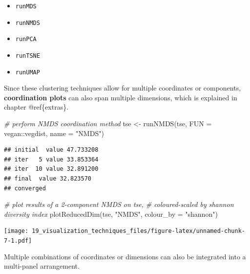 \documentclass[
]{book}
\newenvironment{Shaded}{\begin{snugshade}}{\end{snugshade}}
\newcommand{\AttributeTok}[1]{\textcolor[rgb]{0.77,0.63,0.00}{#1}}
\newcommand{\CommentTok}[1]{\textcolor[rgb]{0.56,0.35,0.01}{\textit{#1}}}
\newcommand{\FunctionTok}[1]{\textcolor[rgb]{0.00,0.00,0.00}{#1}}
\newcommand{\NormalTok}[1]{#1}
\newcommand{\OtherTok}[1]{\textcolor[rgb]{0.56,0.35,0.01}{#1}}
\newcommand{\SpecialCharTok}[1]{\textcolor[rgb]{0.00,0.00,0.00}{#1}}
\newcommand{\StringTok}[1]{\textcolor[rgb]{0.31,0.60,0.02}{#1}}
\providecommand{\tightlist}{%
  \setlength{\itemsep}{0pt}\setlength{\parskip}{0pt}}
\begin{document}
\begin{itemize}
\tightlist
\item
  \texttt{runMDS}
\item
  \texttt{runNMDS}
\item
  \texttt{runPCA}
\item
  \texttt{runTSNE}
\item
  \texttt{runUMAP}
\end{itemize}

Since these clustering techniques allow for multiple coordinates or components,
\textbf{coordination plots} can also span multiple dimensions, which is explained in chapter @ref\{extras\}.

\begin{Shaded}
\begin{Highlighting}[]
\CommentTok{\# perform NMDS coordination method}
\NormalTok{tse }\OtherTok{\textless{}{-}} \FunctionTok{runNMDS}\NormalTok{(tse,}
               \AttributeTok{FUN =}\NormalTok{ vegan}\SpecialCharTok{::}\NormalTok{vegdist,}
               \AttributeTok{name =} \StringTok{"NMDS"}\NormalTok{)}
\end{Highlighting}
\end{Shaded}

\begin{verbatim}
## initial  value 47.733208 
## iter   5 value 33.853364
## iter  10 value 32.891200
## final  value 32.823570 
## converged
\end{verbatim}

\begin{Shaded}
\begin{Highlighting}[]
\CommentTok{\# plot results of a 2{-}component NMDS on tse,}
\CommentTok{\# coloured{-}scaled by shannon diversity index}
\FunctionTok{plotReducedDim}\NormalTok{(tse, }\StringTok{"NMDS"}\NormalTok{, }\AttributeTok{colour\_by =} \StringTok{"shannon"}\NormalTok{)}
\end{Highlighting}
\end{Shaded}

\texttt{[image: 19\_visualization\_techniques\_files/figure-latex/unnamed-chunk-7-1.pdf]}

Multiple combinations of coordinates or dimensions can also be integrated into a multi-panel arrangement.
\end{document}

